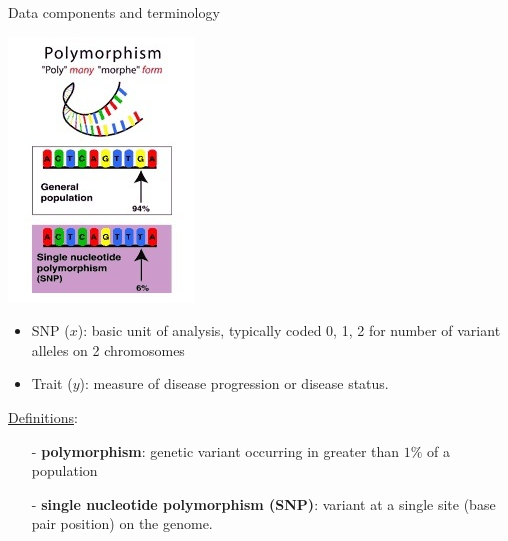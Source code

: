 \documentclass[table]{beamer}\usepackage[]{graphicx}\usepackage[]{color}
\begin{document}
\begin{frame}{Data components and terminology}
\begin{multicols}{2}
\centerline{\includegraphics[scale=.6,angle=0]{polymorphism2.jpg}}
\vspace{.25in}
\begin{itemize}
\item SNP ($x$): basic unit of analysis, typically coded 0, 1, 2 for number of variant alleles on 2 chromosomes
\item Trait ($y$): measure of disease progression or disease status.
\end{itemize}
\end{multicols}
\scriptsize
\underline{Definitions}: 
\begin{enumerate}
\item[-] {\bf polymorphism}: genetic variant occurring in greater than $1\%$ of a population
\item[-] {\bf single nucleotide polymorphism (SNP)}: variant at a single site (base pair position) on the genome.
\end{enumerate}

\end{frame}

\begin{frame}
\end{frame}
\end{document}
